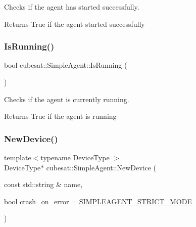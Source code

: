 Checks if the agent has started successfully. 

\begin{DoxyReturn}{Returns}
True if the agent started successfully 
\end{DoxyReturn}
\mbox{\label{classcubesat_1_1SimpleAgent_af347537f1b971c336e651a0e5a423512}} 
\subsubsection{\texorpdfstring{Is\+Running()}{IsRunning()}}
{\footnotesize\ttfamily bool cubesat\+::\+Simple\+Agent\+::\+Is\+Running (\begin{DoxyParamCaption}{ }\end{DoxyParamCaption})\hspace{0.3cm}{\ttfamily [inline]}}



Checks if the agent is currently running. 

\begin{DoxyReturn}{Returns}
True if the agent is running 
\end{DoxyReturn}
\mbox{\label{classcubesat_1_1SimpleAgent_a17c459d98ae8266de47ce2b71d321de0}} 
\subsubsection{\texorpdfstring{New\+Device()}{NewDevice()}}
{\footnotesize\ttfamily template$<$typename Device\+Type $>$ \\
Device\+Type$\ast$ cubesat\+::\+Simple\+Agent\+::\+New\+Device (\begin{DoxyParamCaption}\item[{const std\+::string \&}]{name,  }\item[{bool}]{crash\+\_\+on\+\_\+error = {\ttfamily \hyperlink{SimpleAgent_8h_ae0458b189260d62b7f199e0324dc3cc4}{S\+I\+M\+P\+L\+E\+A\+G\+E\+N\+T\+\_\+\+S\+T\+R\+I\+C\+T\+\_\+\+M\+O\+DE}} }\end{DoxyParamCaption})\hspace{0.3cm}{\ttfamily [inline]}}



